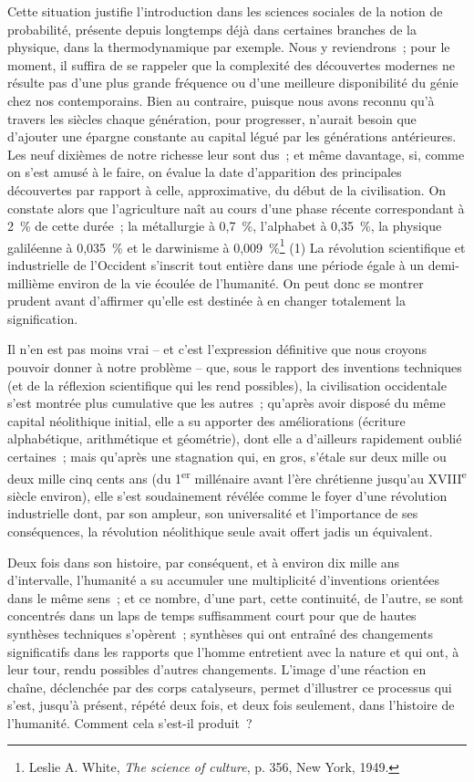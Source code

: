 \documentclass[french,twoside]{book} %
\begin{document}
Cette situation justifie l’introduction dans les sciences sociales de la notion de probabilité, présente depuis longtemps déjà dans certaines branches de la physique, dans la thermodynamique par exemple. Nous y reviendrons ; pour le moment, il suffira de se rappeler que la complexité des découvertes modernes ne résulte pas d’une plus grande fréquence ou d’une meilleure disponibilité du génie chez nos contemporains. Bien au contraire, puisque nous avons reconnu qu’à travers les siècles chaque génération, pour progresser, n’aurait besoin que d’ajouter une épargne constante au capital légué par les générations antérieures. Les neuf dixièmes de notre richesse leur sont dus ; et même davantage, si, comme on s’est amusé à le faire, on évalue la date d’apparition des principales découvertes par rapport à celle, approximative, du début de la civilisation. On constate alors que l’agriculture naît au cours d’une phase récente correspondant à 2 \% de cette durée ; la métallurgie à 0,7 \%, l’alphabet à 0,35 \%, la physique galiléenne à 0,035 \% et le darwinisme à 0,009 \%\footnote{Leslie A. White, \emph{The science of culture}, p. 356, New York, 1949.} (1) La révolution scientifique et industrielle de l’Occident s’inscrit tout entière dans une période égale à un demi-millième environ de la vie écoulée de l’humanité. On peut donc se montrer prudent avant d’affirmer qu’elle est destinée à en changer totalement la signification.\par
Il n’en est pas moins vrai – et c’est l’expression définitive que nous croyons pouvoir donner à notre problème – que, sous le rapport des inventions techniques (et de la réflexion scientifique qui les rend possibles), la civilisation occidentale s’est montrée plus cumulative que les autres ; qu’après avoir disposé du même capital néolithique initial, elle a su apporter des améliorations (écriture alphabétique, arithmétique et géométrie), dont elle a d’ailleurs rapidement oublié certaines ; mais qu’après une stagnation qui, en gros, s’étale sur deux mille ou deux mille cinq cents ans (du 1\textsuperscript{er} millénaire avant l’ère chrétienne jusqu’au XVIII\textsuperscript{e} siècle environ), elle s’est soudainement révélée comme le foyer d’une révolution industrielle dont, par son ampleur, son universalité et l’importance de ses conséquences, la révolution néolithique seule avait offert jadis un équivalent.\par
Deux fois dans son histoire, par conséquent, et à environ dix mille ans d’intervalle, l’humanité a su accumuler une multiplicité d’inventions orientées dans le même sens ; et ce nombre, d’une part, cette continuité, de l’autre, se sont concentrés dans un laps de temps suffisamment court pour que de hautes synthèses techniques s’opèrent ; synthèses qui ont entraîné des changements significatifs dans les rapports que l’homme entretient avec la nature et qui ont, à leur tour, rendu possibles d’autres changements. L’image d’une réaction en chaîne, déclenchée par des corps catalyseurs, permet d’illustrer ce processus qui s’est, jusqu’à présent, répété deux fois, et deux fois seulement, dans l’histoire de l’humanité. Comment cela s’est-il produit ?\par
\end{document}
